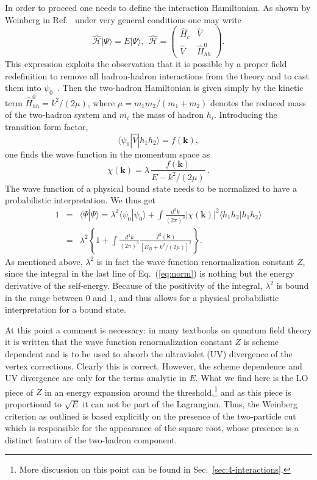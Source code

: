  In order to proceed one needs to define the interaction Hamiltonian. As shown 
 by Weinberg in Ref.~\cite{Weinberg:1963zza} under very general conditions one 
 may write
 \begin{equation}
 \hat {\mathcal H} |\Psi\rangle = E |\Psi\rangle,~~
\hat {\mathcal H} = \left(\begin{array}{cc}
\hat{H}_c&\hat{V}\\
\hat{V}&\hat{H}_{hh}^0
\end{array}
\right) .
 \end{equation}
 This expression exploits the observation that it is possible by a proper field 
 redefinition to remove all hadron-hadron interactions from the theory and to 
 cast them into $\psi_0$~\cite{Weinberg:1962hj,Weinberg:1963zza}. Then the 
 two-hadron Hamiltonian is given simply by the kinetic term $\hat{H}_{hh}^0=k^2/
 (2\mu)$, where $\mu = m_1m_2/(m_1+m_2)$
 denotes the reduced mass of the two-hadron system and $m_i$ the mass of hadron
 $h_i$.
 Introducing the transition form factor,
 \begin{equation}
 \langle \psi_0|\hat {V}|h_1 h_2 \rangle = f(\bm k),
 \end{equation}
 one finds the wave function in the momentum space as
 \begin{equation}
 \chi(\bm k)=\lambda \, \frac{f(\bm k)}{E-k^2/(2\mu)} \ .
 \end{equation}
 The wave function of a physical bound state needs to be normalized to have a
 probabilistic interpretation.
 We thus get \begin{eqnarray}\nonumber
1&=&\langle \Psi|\Psi\rangle = \lambda^2 \langle \psi_0|\psi_0\rangle {+}\!\!\! 
\int \!\! \frac{d^3k}{(2\pi)^3} |\chi(\bm k)|^2 \langle h_1h_2|h_1h_2\rangle \\
&=&  \lambda^2 \left\{1
+\int \frac{d^3k}{(2\pi)^3} \frac{f^2(\bm k)}{\left[E_B+k^2/(2\mu)\right]^2}
\right\}  .
\label{eq:norm}
 \end{eqnarray}
As mentioned above, $\lambda^2$ is in fact the wave function renormalization
constant $Z$, since the integral in the last line of Eq.~(\ref{eq:norm}) is 
nothing but the energy derivative of the self-energy. Because of the positivity 
of the integral, $\lambda^2$ is bound in the range between 0 and 1, and thus 
allows for a physical probabilistic interpretation for a bound state.

At this point a comment is necessary: in many textbooks on quantum field theory
it is written that the wave function renormalization constant $Z$ is scheme
dependent and is to be used to absorb the ultraviolet (UV) divergence of the
vertex corrections. Clearly this is correct. However, the scheme dependence and
UV divergence are only for the terms analytic in $E$.
What we find here is the LO piece of $Z$ in an energy expansion
around the threshold,\footnote{More discussion on this point can be found in
Sec.~\ref{sec:4-interactions}.} and as this
piece is proportional to $\sqrt{E}$ it can not be part of the Lagrangian.
Thus, the Weinberg criterion as outlined is based explicitly on the presence of
the two-particle cut which is responsible for the appearance of the square
root, whose presence is a distinct feature of the two-hadron component.

